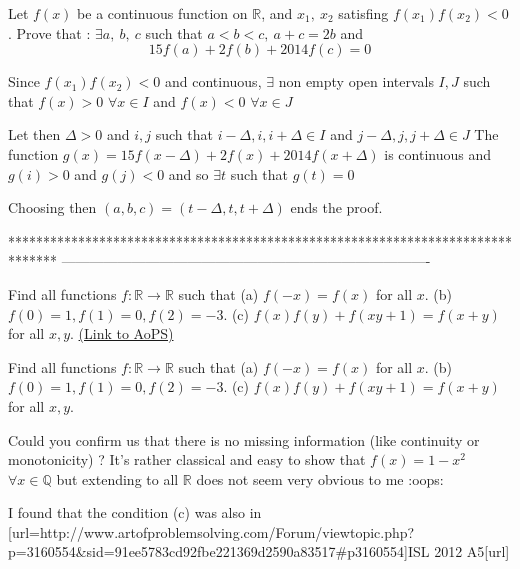 \begin{solution}
	\begin{tcolorbox}Let $f(x)$ be a continuous function on $\mathbb{R}$, and $x_1, \: x_2$ satisfing  $f(x_1)f(x_2)<0$. Prove that :  $\exists a,\: b,\: c$ such that $a<b<c,\: a+c=2b$ and 
\[15f(a)+2f(b)+2014f( c)=0\]\end{tcolorbox}
Since $f(x_1)f(x_2)<0$ and continuous, $\exists$ non empty open intervals $I,J$ such that $f(x)>0$ $\forall x\in I$ and $f(x)<0$ $\forall x\in J$

Let then $\Delta>0$ and $i,j$ such that $i-\Delta,i,i+\Delta\in I$ and $j-\Delta,j,j+\Delta\in J$
The function $g(x)=15f(x-\Delta)+2f(x)+2014f(x+\Delta)$ is continuous and $g(i)>0$ and $g(j)<0$ and so $\exists t$ such that $g(t)=0$

Choosing then $(a,b,c)=(t-\Delta,t,t+\Delta)$ ends the proof.
\end{solution}
*******************************************************************************
-------------------------------------------------------------------------------

\begin{problem}
	Find all functions $ f:\mathbb{R}\to\mathbb{R} $ such that
(a) $ f(-x) = f(x) $ for all $ x $.
(b) $ f(0) = 1, f(1) = 0, f(2) = -3 $.
(c) $ f(x)f(y) + f(xy+1) = f(x+y) $ for all $ x, y $.
	\flushright \href{https://artofproblemsolving.com/community/c6h576630}{(Link to AoPS)}
\end{problem}



\begin{solution}
	\begin{tcolorbox}Find all functions $ f:\mathbb{R}\to\mathbb{R} $ such that
(a) $ f(-x) = f(x) $ for all $ x $.
(b) $ f(0) = 1, f(1) = 0, f(2) = -3 $.
(c) $ f(x)f(y) + f(xy+1) = f(x+y) $ for all $ x, y $.\end{tcolorbox}
Could you confirm us that there is no missing information (like continuity or monotonicity) ?
It's rather classical and easy to show that $f(x)=1-x^2$ $\forall x\in\mathbb Q$ but extending to all $\mathbb R$ does not seem very obvious to me :oops:
\end{solution}



\begin{solution}
	I found that the condition (c) was also in
[url=http://www.artofproblemsolving.com/Forum/viewtopic.php?p=3160554&sid=91ee5783cd92fbe221369d2590a83517#p3160554]ISL 2012 A5[\/url]
\end{solution}



